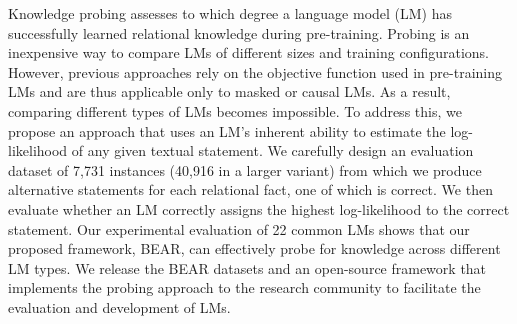 Knowledge probing assesses to which degree a language model (LM) has successfully learned relational knowledge during pre-training. Probing is an inexpensive way to compare LMs of different sizes and training configurations. However, previous approaches rely on the objective function used in pre-training LMs and are thus applicable only to masked or causal LMs. As a result, comparing different types of LMs becomes impossible. To address this, we propose an approach that uses an LM's inherent ability to estimate the log-likelihood of any given textual statement. We carefully design an evaluation dataset of 7,731 instances (40,916 in a larger variant) from which we produce alternative statements for each relational fact, one of which is correct. We then evaluate whether an LM correctly assigns the highest log-likelihood to the correct statement. Our experimental evaluation of 22 common LMs shows that our proposed framework, BEAR, can effectively probe for knowledge across different LM types. We release the BEAR datasets and an open-source framework that implements the probing approach to the research community to facilitate the evaluation and development of LMs.